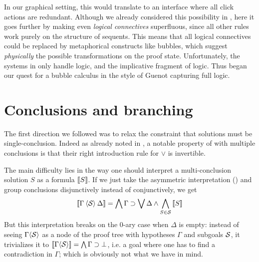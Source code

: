 In our graphical setting, this would translate to an interface where all click
actions are redundant. Although we already considered this possibility in
, here it goes further by making even \emph{logical
connectives} superfluous, since all other rules work purely on the structure of
sequents. This means that all logical connectives could be replaced by
metaphorical constructs like bubbles, which suggest \emph{physically} the
possible transformations on the proof state.
Unfortunately, the systems in \cite{guenot_nested_2013} only handle 
logic, and the implicative fragment of  logic. Thus began our
quest for a bubble calculus in the style of Guenot capturing full 
logic.


\section{Conclusions and branching}

The first direction we followed was to relax the constraint that solutions must
be single-conclusion. Indeed as already noted in , a
notable property of  with multiple conclusions is that their
right introduction rule for $\lor$ is invertible.

The main difficulty lies in the way one should interpret a multi-conclusion
solution $S$ as a formula $\left\llbracket S \right\rrbracket$. If we just take the asymmetric
interpretation () and group conclusions disjunctively instead of
conjunctively, we get
$$
\left\llbracket \Gamma \mathbin{\langle \mathcal{S} \rangle} \Delta \right\rrbracket =
\bigwedge \Gamma \supset \bigvee \Delta \land \bigwedge_{S \in \mathcal{S}}{\left\llbracket S \right\rrbracket}
$$
But this interpretation breaks on the 0-ary case when $\Delta$ is empty: instead
of seeing $\Gamma \mathbin{\langle \mathcal{S} \rangle}$ as a node of the proof tree with hypotheses
$\Gamma$ and subgoals $\mathcal{S}$, it trivializes it to $\left\llbracket \Gamma
\mathbin{\langle \mathcal{S} \rangle} \right\rrbracket = \bigwedge \Gamma \supset \bot$, i.e. a goal where one has to
find a contradiction in $\Gamma$; which is obviously not what we have in mind.

